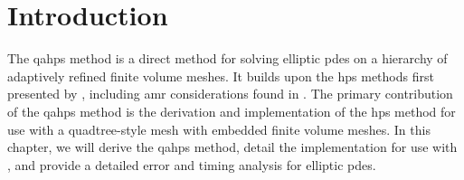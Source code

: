 \section{Introduction}
\label{sec:intro}

The \gls{qahps} method is a direct method for solving elliptic \gls{pdes} on a hierarchy of adaptively refined finite volume meshes. It builds upon the \gls{hps} methods first presented by \citet{gillman2014direct}, including \gls{amr} considerations found in \citep{babb2018accelerated,geldermans2019adaptive}. The primary contribution of the \gls{qahps} method is the derivation and implementation of the \gls{hps} method for use with a quadtree-style mesh with embedded finite volume meshes. In this chapter, we will derive the \gls{qahps} method, detail the implementation for use with \pforest \citep{burstedde2011p4est,burstedde2020parallel}, and provide a detailed error and timing analysis for elliptic \gls{pdes}.